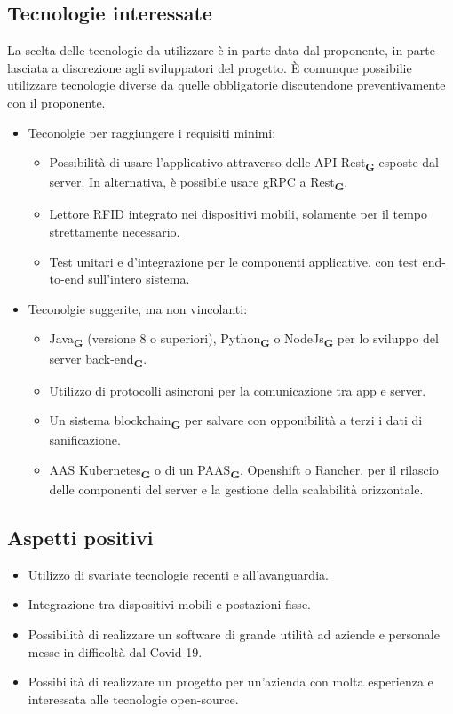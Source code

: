 \subsection{Tecnologie interessate}
La scelta delle tecnologie da utilizzare è in parte data dal proponente, in parte lasciata a discrezione agli sviluppatori del progetto.
È comunque possibilie utilizzare tecnologie diverse da quelle obbligatorie discutendone preventivamente con il proponente.
\begin{itemize}
    \item Teconolgie per raggiungere i requisiti minimi:
    \begin{itemize}
        \item Possibilità di usare l'applicativo attraverso delle API Rest\textsubscript{\textbf{G}} esposte dal server. In alternativa, è possibile usare gRPC a Rest\textsubscript{\textbf{G}}.
        \item Lettore RFID integrato nei dispositivi mobili, solamente per il tempo strettamente necessario.
        \item Test unitari e d'integrazione per le componenti applicative, con test end-to-end sull'intero sistema. 
    \end{itemize}
    \item Teconolgie suggerite, ma non vincolanti:
    \begin{itemize}
        \item Java\textsubscript{\textbf{G}} (versione 8 o superiori), Python\textsubscript{\textbf{G}} o NodeJs\textsubscript{\textbf{G}} per lo sviluppo del server back-end\textsubscript{\textbf{G}}.
        \item Utilizzo di protocolli asincroni per la comunicazione tra app e server.
        \item Un sistema blockchain\textsubscript{\textbf{G}} per salvare con opponibilità a terzi i dati di sanificazione.
        \item AAS Kubernetes\textsubscript{\textbf{G}} o di un PAAS\textsubscript{\textbf{G}}, Openshift o Rancher, per il rilascio delle componenti del server e la gestione della scalabilità orizzontale.
    \end{itemize}
\end{itemize}

\subsection{Aspetti positivi}
\begin{itemize}
    \item Utilizzo di svariate tecnologie recenti e all'avanguardia.
    \item Integrazione tra dispositivi mobili e postazioni fisse.
    \item Possibilità di realizzare un software di grande utilità ad aziende e personale messe in difficoltà dal Covid-19.
    \item Possibilità di realizzare un progetto per un'azienda con molta esperienza e interessata alle tecnologie open-source.
\end{itemize}


